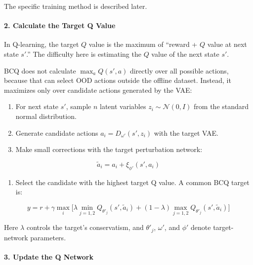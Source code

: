 The specific training method is described later.

\hypertarget{calculate-the-target-q-value}{%
\paragraph{2. Calculate the Target Q Value}\label{calculate-the-target-q-value}}

In Q-learning, the target \(Q\) value is the maximum of ``reward + \(Q\) value at next state \(s'\).'' The difficulty here is estimating the \(Q\) value of the next state \(s'\).

BCQ does not calculate \(\max_a Q(s',a)\) directly over all possible actions, because that can select OOD actions outside the offline dataset. Instead, it maximizes only over candidate actions generated by the VAE:

\begin{enumerate}
\def\labelenumi{\arabic{enumi}.}
\tightlist
\item
  For next state \(s'\), sample \(n\) latent variables \(z_i \sim \mathcal{N}(0,I)\) from the standard normal distribution.
\item
  Generate candidate actions \(a_i = D_{\omega'}(s',z_i)\) with the target VAE.
\item
{}
  Make small corrections with the target perturbation network:
\end{enumerate}

\[
\tilde a_i = a_i + \xi_{\phi'}(s',a_i)
\]

\begin{enumerate}
\def\labelenumi{\arabic{enumi}.}
\setcounter{enumi}{3}
\tightlist
\item
{}
  Select the candidate with the highest target Q value. A common BCQ target is:
\end{enumerate}

\[
y = r + \gamma \max_i \bigl[
\lambda \min_{j=1,2} Q_{\theta'_j}(s', \tilde a_i)
+ (1-\lambda) \max_{j=1,2} Q_{\theta'_j}(s', \tilde a_i)
\bigr]
\]

Here \(\lambda\) controls the target's conservatism, and \(\theta'_j\), \(\omega'\), and \(\phi'\) denote target-network parameters.

\hypertarget{update-the-q-network}{%
\paragraph{3. Update the Q Network}\label{update-the-q-network}}

